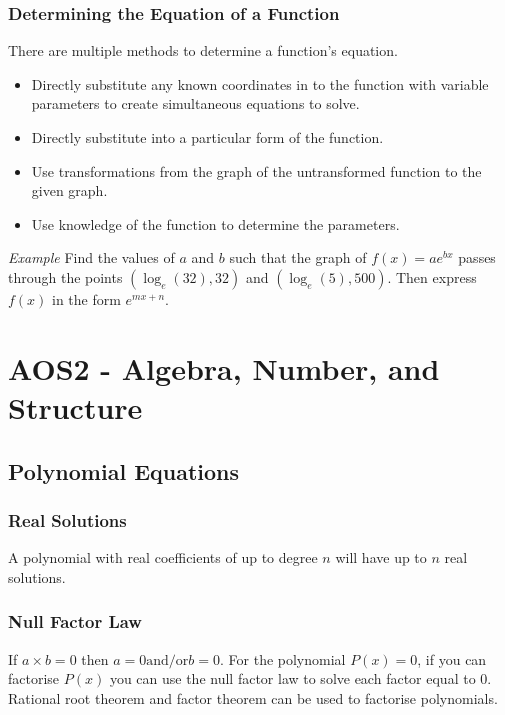 \documentclass{article}
\begin{document}
			\subsubsection{Determining the Equation of a Function}
				There are multiple methods to determine a function's equation.
				\begin{itemize}
					\item Directly substitute any known coordinates in to the function with variable parameters to create simultaneous equations to solve.
					\item Directly substitute into a particular form of the function.
					\item Use transformations from the graph of the untransformed function to the given graph.
					\item Use knowledge of the function to determine the parameters.
				\end{itemize}
				\noindent\textit{Example}\newline
				Find the values of $a$ and $b$ such that the graph of $f(x)=ae^{bx}$ passes through the points $(\log_e(32),32)$ and $(\log_e(5),500)$. Then express $f(x)$ in the form $e^{mx+n}$.
	\section*{AOS2 - Algebra, Number, and Structure}
		\subsection{Polynomial Equations}
			\subsubsection{Real Solutions}
				A polynomial with real coefficients of up to degree $n$ will have up to $n$ real solutions.
			\subsubsection{Null Factor Law}
				If $a\times b=0$ then $a=0 \text{and/or} b=0$.\newline
				For the polynomial $P(x)=0$, if you can factorise $P(x)$ you can use the null factor law to solve each factor equal to 0.\newline
				Rational root theorem and factor theorem can be used to factorise polynomials.
\end{document}
